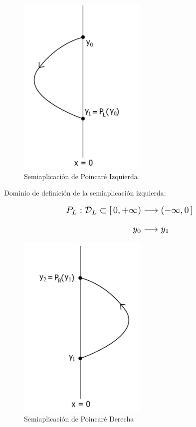 \documentclass[12pt,a4paper]{report} %
\begin{document}
	
	\begin{figure}[h]
		\centering
		\includegraphics[width=0.55\textwidth]{semiL.jpg}
		\caption{Semiaplicación de Poincaré Izquierda}
		\label{fig:semiL}
	\end{figure}\smallskip
	
	\vspace{0.5cm}Dominio de definición de la semiaplicación izquierda:
	
	\vspace{0.5cm}
	
	\begin{equation}
		\label{eq:dl}
		\scalebox{1.3}{$\displaystyle
		\begin{aligned}
		P_L:\mathcal{D}_L\subset [\,0,+\infty) &\longrightarrow ( -\infty,0\, ]\\[2mm]
		y_0 &\longrightarrow y_1
	\end{aligned}
	$}
	\end{equation}
	
	\newpage
	
	\begin{figure}[h]
		\centering
		\includegraphics[width=0.55\textwidth]{semiR.jpg}
		\caption{Semiaplicación de Poincaré Derecha}
		\label{fig:semiR}
	\end{figure}\smallskip
	
\end{document}
